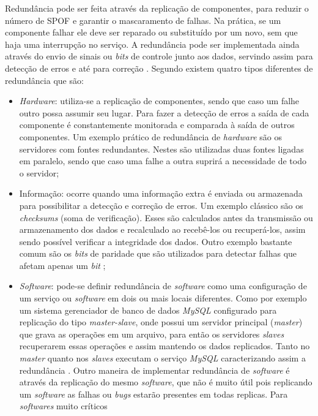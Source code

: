 Redundância pode ser feita através da replicação de componentes, para reduzir o número de \ac{SPOF} e garantir o mascaramento de falhas.
Na prática, se um componente falhar ele deve ser reparado ou substituído por um novo, sem que haja uma interrupção no serviço.
A redundância pode ser implementada ainda através do envio de sinais ou \textit{bits} de controle junto aos dados, servindo assim para 
detecção de erros e até para correção \cite{weber2002}. Segundo \cite{norvag2000} existem quatro tipos diferentes de redundância que são:
\begin{itemize}
 \item \textit{Hardware}: utiliza-se a replicação de componentes, sendo que caso um falhe outro possa assumir seu lugar. 
 Para fazer a detecção de erros a saída de cada componente é constantemente monitorada e comparada à saída de outros componentes.
 Um exemplo prático de redundância de \textit{hardware} são os servidores com fontes redundantes. Nestes são utilizadas duas fontes ligadas 
 em paralelo, sendo que caso uma falhe a outra suprirá a necessidade de todo o servidor;
 \item Informação: ocorre quando uma informação extra é enviada ou armazenada para possibilitar a detecção e correção de erros.
 Um exemplo clássico são os \textit{checksums} (soma de verificação). Esses são calculados antes da transmissão ou armazenamento dos dados 
 e recalculado ao recebê-los ou recuperá-los, assim sendo possível verificar a integridade dos dados. Outro exemplo bastante comum são os 
 \textit{bits} de paridade que são utilizados para detectar falhas que afetam apenas um \textit{bit} \cite{weber2002};
 \item \textit{Software}: pode-se definir redundância de \textit{software} como uma configuração de um serviço ou \textit{software} em
 dois ou mais locais diferentes. Como por exemplo um sistema gerenciador de banco de dados \textit{MySQL} configurado para
 replicação do tipo \textit{master-slave}, onde possui um servidor principal (\textit{master}) que grava as operações em um arquivo, 
 para então os servidores \textit{slaves} recuperarem essas operações e assim mantendo os dados replicados. Tanto no \textit{master} 
 quanto nos \textit{slaves} executam o serviço \textit{MySQL} caracterizando assim a redundância \cite{viana201}.
 Outro maneira de implementar redundância de \textit{software} é através da replicação do mesmo \textit{software}, que não é muito útil 
 pois replicando um \textit{software} as falhas ou \textit{bugs} estarão presentes em todas replicas. Para \textit{softwares} muito críticos

\end{itemize}

